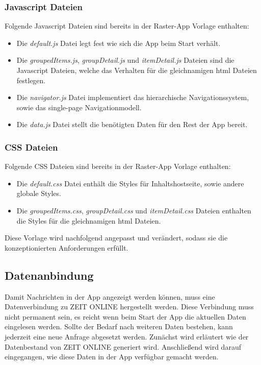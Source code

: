 \documentclass[12pt,a4paper,bibtotoc,abstracton]{scrartcl}
\begin{document}
\subsubsection{Javascript Dateien}
\label{subsubsec:javascriptdateien} 
Folgende Javascript Dateien sind bereits in der Raster-App Vorlage enthalten:
\begin{itemize}
	\item Die \textit{default.js} Datei legt fest wie sich die App beim Start verhält.
	\item Die \textit{groupedItems.js}, \textit{groupDetail.js} und \textit{itemDetail.js} Dateien sind die Javascript Dateien, welche das Verhalten für die gleichnamigen \ac{html} Dateien festlegen.
	\item Die \textit{navigator.js} Datei implementiert das hierarchische Navigationssystem, sowie das single-page Navigationmodell.
	\item Die \textit{data.js} Datei stellt die benötigten Daten für den Rest der App bereit.
\end{itemize}

\subsubsection{CSS Dateien}
\label{subsubsec:cssdateien} 
Folgende CSS Dateien sind bereits in der Raster-App Vorlage enthalten:
\begin{itemize}
	\item Die \textit{default.css} Datei enthält die Styles für Inhaltshostseite, sowie andere globale Styles.
	\item Die \textit{groupedItems.css}, \textit{groupDetail.css} und \textit{itemDetail.css} Dateien enthalten die Styles für die gleichnamigen \ac{html} Dateien.
\end{itemize}

Diese Vorlage wird nachfolgend angepasst und verändert, sodass sie die konzeptionierten Anforderungen erfüllt.

\subsection{Datenanbindung}
\label{subsec:datenanbindung}
Damit Nachrichten in der App angezeigt werden können, muss eine Datenverbindung zu ZEIT ONLINE hergestellt werden. Diese Verbindung muss nicht permanent sein, es reicht wenn beim Start der App die aktuellen Daten eingelesen werden. Sollte der Bedarf nach weiteren Daten bestehen, kann jederzeit eine neue Anfrage abgesetzt werden. Zunächst wird erläutert wie der Datenbestand von ZEIT ONLINE generiert wird. Anschließend wird darauf eingegangen, wie diese Daten in der App verfügbar gemacht werden.
\end{document}
